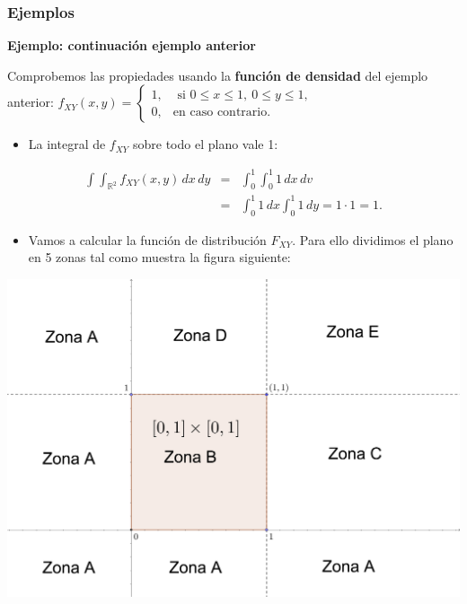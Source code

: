 \documentclass[]{book}
\providecommand{\tightlist}{%
  \setlength{\itemsep}{0pt}\setlength{\parskip}{0pt}}
\begin{document}
\hypertarget{ejemplos-1}{%
\subsubsection{Ejemplos}\label{ejemplos-1}}

\textbf{Ejemplo: continuación ejemplo anterior}

Comprobemos las propiedades usando la \textbf{función de densidad} del ejemplo anterior:
\(f_{XY}(x,y)=\begin{cases} 1, & \mbox{ si }0\leq x\leq 1,\ 0\leq y\leq 1, \\ 0, & \mbox{en caso contrario.} \end{cases}\)

\begin{itemize}
\tightlist
\item
  La integral de \(f_{XY}\) sobre todo el plano vale 1:
\end{itemize}

\[
\begin{array}{rcl}
\int\int_{\mathbb{R}^2} f_{XY}(x,y)\,dx\, dy &=&\int_0^1\int_0^1 1\, dx\, dv\\
&=&\int_0^1 1\, dx\int_0^1 1\, dy=1\cdot 1=1.
\end{array}
\]

\begin{itemize}
\tightlist
\item
  Vamos a calcular la función de distribución \(F_{XY}\). Para ello dividimos el plano en 5 zonas tal como muestra la figura siguiente:
\end{itemize}

\includegraphics{Images/VaUniformeBidi2.png}
\end{document}
